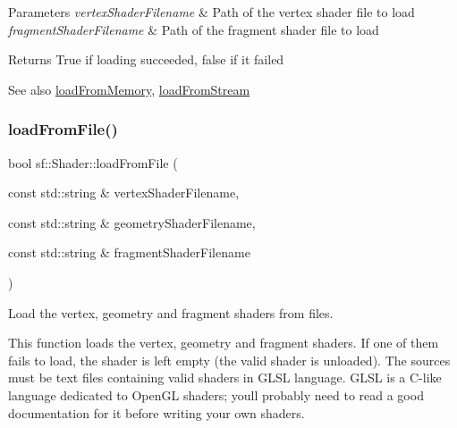 \begin{DoxyParams}{Parameters}
{\em vertex\+Shader\+Filename} & Path of the vertex shader file to load \\
\hline
{\em fragment\+Shader\+Filename} & Path of the fragment shader file to load\\
\hline
\end{DoxyParams}
\begin{DoxyReturn}{Returns}
True if loading succeeded, false if it failed
\end{DoxyReturn}
\begin{DoxySeeAlso}{See also}
\hyperlink{classsf_1_1_shader_ac92d46bf71dff2d791117e4e472148aa}{load\+From\+Memory}, \hyperlink{classsf_1_1_shader_a2ee1b130c0606e4f8bcdf65c1efc2a53}{load\+From\+Stream} 
\end{DoxySeeAlso}
\mbox{\label{classsf_1_1_shader_a295d8468811ca15bf9c5401a7a7d4f54}} 
\subsubsection{\texorpdfstring{load\+From\+File()}{loadFromFile()}\hspace{0.1cm}{\footnotesize\ttfamily [3/3]}}
{\footnotesize\ttfamily bool sf\+::\+Shader\+::load\+From\+File (\begin{DoxyParamCaption}\item[{const std\+::string \&}]{vertex\+Shader\+Filename,  }\item[{const std\+::string \&}]{geometry\+Shader\+Filename,  }\item[{const std\+::string \&}]{fragment\+Shader\+Filename }\end{DoxyParamCaption})}



Load the vertex, geometry and fragment shaders from files. 

This function loads the vertex, geometry and fragment shaders. If one of them fails to load, the shader is left empty (the valid shader is unloaded). The sources must be text files containing valid shaders in G\+L\+SL language. G\+L\+SL is a C-\/like language dedicated to Open\+GL shaders; you\textquotesingle{}ll probably need to read a good documentation for it before writing your own shaders.


